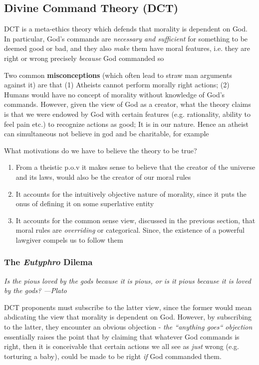 \documentclass[english,course]{Notes}
\newcommand{\ita}[1]{\textit{#1}}
\newcommand\quo[1]{\begin{displayquote}\ita{\large{#1}}\end{displayquote}}
\begin{document}
{{\subsection{Divine Command Theory (DCT)}

\par{DCT is a meta-ethics theory which defends that morality is dependent on God. In particular, God's commands are \ita{necessary and sufficient} for something to be deemed good or bad, and they also \ita{make} them have moral features, i.e. they are right or wrong precisely \ita{because} God commanded so}

\par{Two common \textbf{misconceptions} (which often lead to straw man arguments against it) are that (1) Atheists cannot perform morally right actions; (2) Humans would have no concept of morality without knowledge of God's commands. However, given the view of God as a creator, what the theory claims is that we were endowed by God with certain features (e.g. rationality, ability to feel pain etc.) to recognize actions as good; It is in our nature. Hence an atheist can simultaneous not believe in god and be charitable, for example \\}

\par{What motivations do we have to believe the theory to be true?}
\begin{enumerate}
    \item{From a theistic p.o.v it makes sense to believe that the creator of the universe and its laws, would also be the creator of our moral rules}
    \item{It accounts for the intuitively objective nature of morality, since it puts the onus of defining it on some superlative entity}
    \item{It accounts for the common sense view, discussed in the previous section, that moral rules are \ita{overriding} or categorical. Since, the existence of a powerful lawgiver compels us to follow them}
\end{enumerate}

\subsubsection{The \ita{Eutyphro} Dilema}

\quo{Is the pious loved by the gods because it is pious, or is it pious because it is loved by the gods? ---Plato}

\par{DCT proponents must subscribe to the latter view, since the former would mean abdicating the view that morality is dependent on God. However, by subscribing to the latter, they encounter an obvious objection - \ita{the ``anything goes`` objection} essentially raises the point that by claiming that whatever God commands is right, then it is conceivable that certain actions we all see as \ita{just} wrong (e.g. torturing a baby), could be made to be right \ita{if} God commanded them.}

}}
\end{document}

